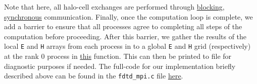 \documentclass[a4paper,10pt]{article}
\begin{document}
\begin{multicols}{2}
Note that here, all halo-cell exchanges are performed through \underline{blocking, synchronous} communication. Finally, once the computation loop is complete, we add a barrier to ensure that all processes agree to completing all steps of the computation before proceeding. After this barrier, we gather the results of the local \verb|E| and \verb|H| arrays from each process in to a global \verb|E| and \verb|H| grid (respectively) at the rank 0 process in \href{https://github.com/paulmyr/DD2356-MethodsHPC/blob/master/5_project/3_mpi/fdtd_mpi.c#L108}{this} function. This can then be printed to file for diagnostic purposes if needed. The full-code for our implementation briefly described above can be found in the \verb|fdtd_mpi.c| file \href{https://github.com/paulmyr/DD2356-MethodsHPC/blob/master/5_project/3_mpi/fdtd_mpi.c}{here}.
\end{multicols}
\end{document}
